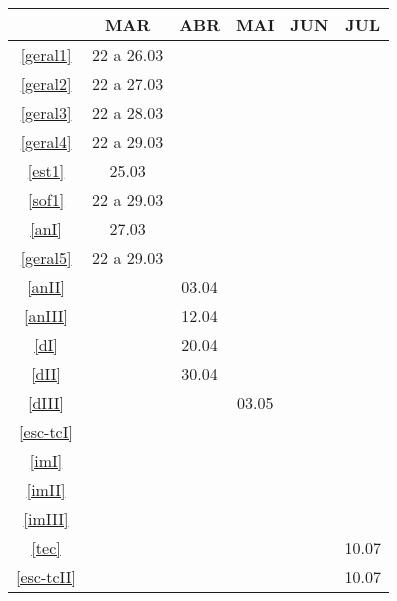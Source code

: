 \begin{table}[!htbp]
	\centering
		\begin{tabular}{cccccc}
		\hline
		
		&MAR&ABR&MAI&JUN&JUL\\
		\hline
		\ref{geral1}&\cellcolor{gray}22 a 26.03&&&&\\
		
		\ref{geral2}&\cellcolor{gray}22 a 27.03&&&&\\
		
		\ref{geral3}&\cellcolor{gray}22 a 28.03&&&&\\
		
		\ref{geral4}&\cellcolor{gray}22 a 29.03&&&&\\
		
		\ref{est1}&\cellcolor{gray}25.03&&&&\\
		
		\ref{sof1}&\cellcolor{gray}22 a 29.03&&&&\\
		
		\ref{anI}&\cellcolor{midgray}27.03&&&&\\
		
		\ref{geral5}&\cellcolor{gray}22 a 29.03&&&&\\
			
		\ref{anII}&&\cellcolor{midgray}03.04&&&\\
					
		\ref{anIII}&&\cellcolor{midgray}12.04&&&\\
			
		\ref{dI}&&\cellcolor{midgray}20.04&&&\\
		
		\ref{dII}&&\cellcolor{midgray}30.04&&&\\
			
		\ref{dIII}&&&\cellcolor{midgray}03.05&&\\
			
		\ref{esc-tcI}&&&\cellcolor{midgray}&&\\
			
		\ref{imI}&&&\cellcolor{midgray}&&\\
			
		\ref{imII}&&&&\cellcolor{midgray}&\\
			
		\ref{imIII}&&&&\cellcolor{midgray}&\\
			
		\ref{tec}&&&&&\cellcolor{midgray}10.07\\
			
		\ref{esc-tcII}&&&&&\cellcolor{midgray}10.07\\
		\hline	
		\end{tabular}
\end{table}

